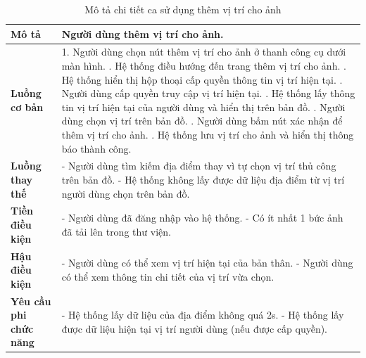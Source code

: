 \noindent 
\begin{xltabular}{\linewidth}{| l | X |} 
\caption{Mô tả chi tiết ca sử dụng thêm vị trí cho ảnh}
\label{tab:add-location-usecase}\\
\hline 
\textbf{Mô tả} & Người dùng thêm vị trí cho ảnh. \\
\hline 
\textbf{Luồng cơ bản} & 1. Người dùng chọn nút thêm vị trí cho ảnh ở thanh công cụ dưới màn hình. . Hệ thống điều hướng đến trang thêm vị trí cho ảnh. . Hệ thống hiển thị hộp thoại cấp quyền thông tin vị trí hiện tại. . Người dùng cấp quyền truy cập vị trí hiện tại. . Hệ thống lấy thông tin vị trí hiện tại của người dùng và hiển thị trên bản đồ. . Người dùng chọn vị trí trên bản đồ. . Người dùng bấm nút xác nhận để thêm vị trí cho ảnh. . Hệ thống lưu vị trí cho ảnh và hiển thị thông báo thành công. \\
\hline
\textbf{Luồng thay thế} & - Người dùng tìm kiếm địa điểm thay vì tự chọn vị trí thủ công trên bản đồ. \newline
                          - Hệ thống không lấy được dữ liệu địa điểm từ vị trí người dùng chọn trên bản đồ. \\
\hline
\textbf{Tiền điều kiện} & - Người dùng đã đăng nhập vào hệ thống. \newline
                          - Có ít nhất 1 bức ảnh đã tải lên trong thư viện. \\
\hline
\textbf{Hậu điều kiện} & - Người dùng có thể xem vị trí hiện tại của bản thân. \newline
                          - Người dùng có thể xem thông tin chi tiết của vị trí vừa chọn. \\
\hline 
\textbf{Yêu cầu phi chức năng} & - Hệ thống lấy dữ liệu của địa điểm không quá 2s. \newline
                           - Hệ thống lấy được dữ liệu hiện tại vị trí người dùng (nếu được cấp quyền). \\
\hline 
\end{xltabular}

